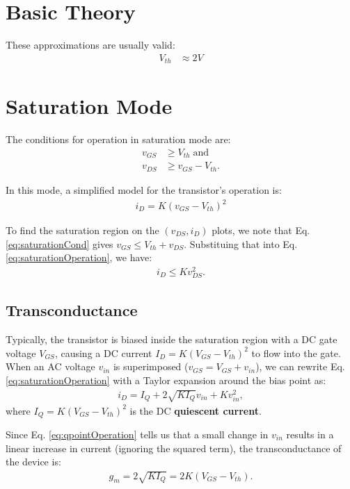 \documentclass[letterpaper,10pt]{report}
\begin{document}
\section{Basic Theory}

These approximations are usually valid:
\begin{align}
 V_{th} &\approx 2V
\end{align}

\section{Saturation Mode}

The conditions for operation in saturation mode are:
\begin{align}
 v_{GS} &\geq V_{th} \; \text{and}\\
 v_{DS} &\geq v_{GS} - V_{th}. \label{eq:saturationCond}
\end{align}

In this mode, a simplified model for the transistor's operation is:
\begin{align}
 i_D = K(v_{GS}-V_{th})^2 \label{eq:saturationOperation}
\end{align}

To find the saturation region on the $(v_{DS},i_D)$
plots, we note that Eq. \eqref{eq:saturationCond} gives
$v_{GS} \leq V_{th}+v_{DS}$. Substituing that into Eq. \eqref{eq:saturationOperation},
we have:
\begin{align}
 i_D \leq Kv_{DS}^2. \label{eq:saturationCond2}
\end{align}

\subsection{Transconductance}

Typically, the transistor is biased inside the saturation region with a DC
gate voltage $V_{GS}$, causing a DC current $I_D=K(V_{GS}-V_{th})^2$ to flow
into the gate. When an AC voltage $v_{in}$ is superimposed
($v_{GS}=V_{GS}+v_{in}$), we can rewrite Eq. \eqref{eq:saturationOperation}
with a Taylor expansion around the bias point as:
\begin{align}
 i_D = I_Q + 2\sqrt{KI_Q} v_{in} + K v_{in}^2, \label{eq:qpointOperation}
\end{align}
where $I_Q=K(V_{GS}-V_{th})^2$ is the DC \textbf{quiescent current}.

Since Eq. \eqref{eq:qpointOperation} tells us that a small change in $v_{in}$
results in a linear increase in current (ignoring the squared term), the
transconductance of the device is:
\begin{align}
 g_m = 2\sqrt{KI_Q} = 2K(V_{GS}-V_{th}).
\end{align}
\end{document}
